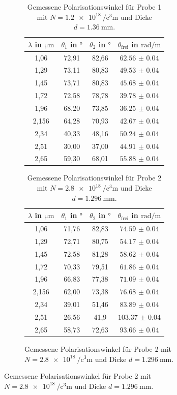 \begin{figure}[H]
\begin{figure}
\begin{table}[H]
    \centering
    \caption{Gemessene Polarisationswinkel für Probe 1 mit $N = \qty{1.2e18}{\per\cubic\centi\meter}$ und Dicke $d = \qty{1.36}{\milli\meter}$.}
    \label{tab:probe1}
    \begin{tabular}{c c c c}
        \toprule
        {$\lambda$ in $\si{\micro\meter}$} & {$\theta_1$ in $\si{\degree}$} & {$\theta_2$ in $\si{\degree}$} & {$\theta_\text{frei}$ in $\si{\radian\per\meter}$} \\
        \midrule
        1,06 & 72,91 & 82,66 & {$\num{62.56(4)}$} \\
        1,29 & 73,11 & 80,83 & {$\num{49.53(4)}$} \\
        1,45 & 73,71 & 80,83 & {$\num{45.68(4)}$} \\ 
        1,72 & 72,58 & 78,78 & {$\num{39.78(4)}$} \\ 
        1,96 & 68,20 & 73,85 & {$\num{36.25(4)}$} \\
        2,156& 64,28 & 70,93 & {$\num{42.67(4)}$} \\
        2,34 & 40,33 & 48,16 & {$\num{50.24(4)}$} \\
        2,51 & 30,00 & 37,00 & {$\num{44.91(4)}$} \\
        2,65 & 59,30 & 68,01 & {$\num{55.88(4)}$} \\
        \bottomrule
    \end{tabular}
\end{table}

\begin{table}[H]
    \centering
    \caption{Gemessene Polarisationswinkel für Probe 2 mit $N = \qty{2.8e18}{\per\cubic\centi\meter}$ und Dicke $d = \qty{1.296}{\milli\meter}$.}
    \label{tab:probe2}
    \begin{tabular}{c c c c}
        \toprule
        {$\lambda$ in $\si{\micro\meter}$} & {$\theta_1$ in $\si{\degree}$} & {$\theta_2$ in $\si{\degree}$} & {$\theta_\text{frei}$ in $\si{\radian\per\meter}$} \\
        \midrule
        1,06 & 71,76 & 82,83 & $\num{74.59(4)}$ \\
        1,29 & 72,71 & 80,75 & $\num{54.17(4)}$ \\
        1,45 & 72,58 & 81,28 & $\num{58.62(4)}$ \\
        1,72 & 70,33 & 79,51 & $\num{61.86(4)}$ \\
        1,96 & 66,83 & 77,38 & $\num{71.09(4)}$ \\
        2,156& 62,00 & 73,38 & $\num{76.68(4)}$ \\
        2,34 & 39,01 & 51,46 & $\num{83.89(4)}$ \\ 
        2,51 & 26,56 & 41,9  & $\num{103.37(4)}$ \\
        2,65 & 58,73 & 72,63 & $\num{93.66(4)}$ \\ 
        \bottomrule
    \end{tabular}
\end{table}


\end{figure}
\end{figure}
